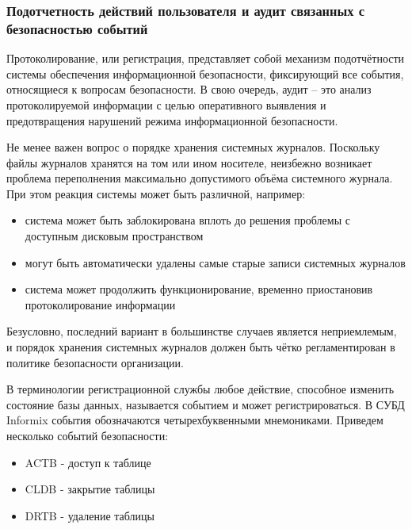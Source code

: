 \subsubsection{Подотчетность действий пользователя и аудит связанных с безопасностью событий}
Протоколирование, или регистрация, представляет собой механизм подотчётности системы обеспечения
информационной безопасности, фиксирующий все события, относящиеся к вопросам безопасности. В свою
очередь, аудит – это анализ протоколируемой информации с целью оперативного выявления и
предотвращения нарушений режима информационной безопасности.

Не менее важен вопрос о порядке хранения системных журналов. Поскольку файлы журналов хранятся на
том или ином носителе, неизбежно возникает проблема переполнения максимально допустимого объёма
системного журнала. При этом реакция системы может быть различной, например:
\begin{itemize}
    \item система может быть заблокирована вплоть до решения проблемы с доступным дисковым пространством
    \item могут быть автоматически удалены самые старые записи системных журналов
    \item система может продолжить функционирование, временно приостановив протоколирование информации
\end{itemize}

Безусловно, последний вариант в большинстве случаев является неприемлемым, и порядок хранения
системных журналов должен быть чётко регламентирован в политике безопасности организации.

В терминологии регистрационной службы любое действие, способное изменить состояние базы данных,
называется событием и может регистрироваться. В СУБД Informix события обозначаются
четырехбуквенными мнемониками. Приведем несколько событий безопасности:
\begin{itemize}
    \item ACTB - доступ к таблице
    \item CLDB - закрытие таблицы
    \item DRTB - удаление таблицы
\end{itemize}


